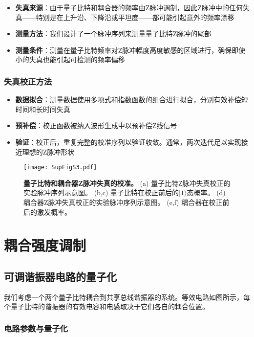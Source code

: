 \documentclass[11pt,a4paper]{article}
\begin{document}
\begin{itemize}
    \item \textbf{失真来源}：由于量子比特和耦合器的频率由Z脉冲调制，因此Z脉冲中的任何失真——特别是在上升沿、下降沿或平坦度——都可能引起意外的频率漂移
    \item \textbf{测量方法}：我们设计了一个脉冲序列来测量量子比特Z脉冲的尾部
    \item \textbf{测量条件}：测量在量子比特频率对Z脉冲幅度高度敏感的区域进行，确保即使小的失真也能引起可检测的频率偏移
\end{itemize}

\subsubsection{失真校正方法}

\begin{itemize}
    \item \textbf{数据拟合}：测量数据使用多项式和指数函数的组合进行拟合，分别有效补偿短时间和长时间失真
    \item \textbf{预补偿}：校正函数被纳入波形生成中以预补偿Z线信号
    \item \textbf{验证}：校正后，重复完整的校准序列以验证收敛。通常，两次迭代足以实现接近理想的Z脉冲形状
\end{itemize}

\begin{figure}[H]
    \centering
    \texttt{[image: SupFigS3.pdf]}
    \caption{
        \textbf{量子比特和耦合器Z脉冲失真的校准。}
        (a) 量子比特Z脉冲失真校正的实验脉冲序列示意图。
        (b,c) 量子比特在校正前后的$|1\rangle$态概率。
        (d) 耦合器Z脉冲失真校正的实验脉冲序列示意图。
        (e,f) 耦合器在校正前后的激发概率。
    }
    \label{fig:Z_pulse_calibration}
\end{figure}

\clearpage
\section{耦合强度调制}

\subsection{可调谐振器电路的量子化}

我们考虑一个两个量子比特耦合到共享总线谐振器的系统。等效电路如图所示，每个量子比特的谐振器的有效电容和电感取决于它们各自的耦合位置。

\subsubsection{电路参数与量子化}
\end{document}

